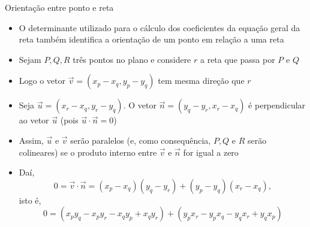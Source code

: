 \begin{frame}[fragile]{Orientação entre ponto e reta}

    \begin{itemize}
        \item O determinante utilizado para o cálculo dos coeficientes da equação geral da reta
            também identifica a orientação de um ponto em relação a uma reta
        \pause

        \item Sejam $P, Q, R$ três pontos no plano e considere $r$ a reta que passa por $P$ e $Q$
        \pause

        \item Logo o vetor $\vec{v} = (x_p - x_q, y_p - y_q)$ tem mesma direção que $r$
        \pause

        \item Seja $\vec{u} = (x_r - x_q, y_r - y_q)$. O vetor $\vec{n} = (y_q - y_r, x_r - x_q)$
        é perpendicular ao vetor $\vec{u}$ (pois $\vec{u}\cdot \vec{n} = 0$)
        \pause

        \item Assim, $\vec{u}$ e $\vec{v}$ serão paralelos (e, como consequência, $P, Q$ e $R$
            serão colineares) se o produto interno entre $\vec{v}$ e $\vec{n}$ for igual a zero
        \pause

        \item Daí,
        \[
            0 = \vec{v}\cdot \vec{n} = (x_p - x_q)(y_q - y_r) + (y_p - y_q)(x_r - x_q),
        \]
        isto é,
        \[
            0 = (x_py_q - x_py_r - x_qy_p + x_qy_r) + (y_px_r - y_px_q - y_qx_r + y_qx_p)
        \]
    \end{itemize}

\end{frame}


